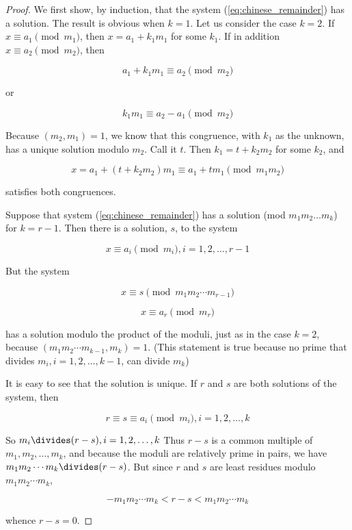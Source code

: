 \documentclass{article}
\theoremstyle{definition} %
\theoremstyle{definition}
\theoremstyle{definition}
\theoremstyle{definition}
\begin{document}
  \begin{proof}
    We first show, by induction, that the system (\ref{eq:chinese_remainder}) has a solution. The result
    is obvious when $k = 1$. Let us consider the case $k = 2$. If $x \equiv a_1 \pmod{m_1}$, then
    $x = a_1 + k_1m_1$ for some $k_1$. If in addition $x \equiv a_2 \pmod{m_2}$, then
    
    \[ a_1 + k_1m_1 \equiv a_2 \pmod{m_2} \]
    
    or
    
    \[ k_1m_1 \equiv a_2 - a_1 \pmod{m_2} \]
    
    Because $(m_2, m_1) = 1$, we know that this congruence, with $k_1$ as the unknown, has a unique
    solution modulo $m_2$. Call it $t$. Then $k_1 = t + k_2m_2$ for some $k_2$, and
    
    \[ x = a_1 + (t + k_2m_2)m_1 \equiv a_1 + tm_1 \pmod{m_1m_2} \]
    
    satisfies both congruences.
    
    Suppose that system (\ref{eq:chinese_remainder}) has a solution (mod $m_1m_2\dots m_k$) for
    $k = r - 1$. Then there is a solution, $s$, to the system
    
    \[ x \equiv a_i\pmod{m_i}, i = 1, 2, \dots, r - 1 \]
    
    But the system
    
    \[ x \equiv s \pmod{m_1m_2\cdots m_{r-1}}\]
    
    \[ x\equiv a_r \pmod{m_r} \]
    
    has a solution modulo the product of the moduli, just as in the case $k = 2$, because
    $(m_1m_2\cdots m_{k-1}, m_k) = 1$. (This statement is true because no prime that
    divides $m_i, i = 1, 2, \dots, k-1$, can divide $m_k$)
    
    It is easy to see that the solution is unique. If $r$ and $s$ are both solutions of the
    system, then
    
    \[ r \equiv s \equiv a_i \pmod{m_i}, i = 1, 2, \dots, k \]
    
    So $m_i \divides (r - s), i = 1, 2, \dots, k$ Thus $r - s$ is a common multiple of
    $m_1, m_2, \dots, m_k$, and because the moduli are relatively prime in pairs,
    we have $m_1m_2\cdots m_k \divides (r - s)$. But since $r$ and $s$ are
    least residues modulo $m_1m_2\cdots m_k$,
    
    \[ -m_1m_2\cdots m_k < r - s < m_1m_2\cdots m_k \]
    
    whence $r - s = 0$.
  \end{proof}
  
\end{document}
